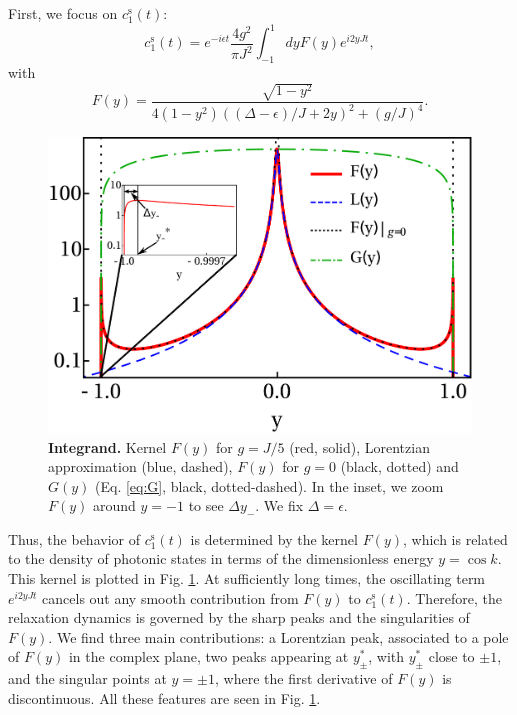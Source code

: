 \documentclass[aps,pra,twocolumn,floatfix,superscriptaddress]{revtex4-1}%
\begin{document}
First, we focus on  $c_1^\text{s}(t)$:
\begin{equation}
c_1^\text{s}(t) =  e^{-i\epsilon t}\frac{4g^2}{\pi J^2}\int_{-1}^1 dy F(y)e^{i2yJt}, \label{eq:c_sc_app}
\end{equation}
with
\begin{equation}
F(y)=\frac{\sqrt{1-y^2}}{4(1-y^2)\left((\Delta-\epsilon)/J+2y\right)^2+(g/J)^4}.\label{eq:F}
\end{equation}
\begin{figure}[thb!]
\includegraphics[width=1.0\columnwidth]{integrand_inset_Delta_0_g_0_2.pdf}
\caption{{\bf Integrand.} Kernel $F(y)$ for $g=J/5$ (red, solid), Lorentzian approximation (blue, dashed), $F(y)$ for $g=0$ (black, dotted) and $G(y)$ (Eq. \eqref{eq:G}, black, dotted-dashed). In the inset, we zoom $F(y)$ around $y=-1$ to see $\Delta y_-$. We fix $\Delta=\epsilon$.}\label{fig:integrand}
\end{figure}
Thus, the behavior of $c_1^\text{s}(t)$ is determined by the kernel $F(y)$, which is related to the density of photonic states in terms of the dimensionless energy $y = \cos k$. This kernel is plotted in Fig. \ref{fig:integrand}. At sufficiently long times, the oscillating term $e^{i2yJt}$ cancels out any smooth contribution from $F(y)$ to $c_1^\text{s}(t)$. %
Therefore, the relaxation dynamics is governed by the sharp peaks and the singularities of $F(y)$. We find three main contributions: a Lorentzian peak, associated to a pole of $F(y)$ in the complex plane, two peaks appearing at $y_\pm^*$, with $y_\pm^*$ close to $\pm 1$, and the singular points at $y=\pm 1$, where the first derivative of $F(y)$ is discontinuous. All these features are seen in Fig. \ref{fig:integrand}.
\end{document}

